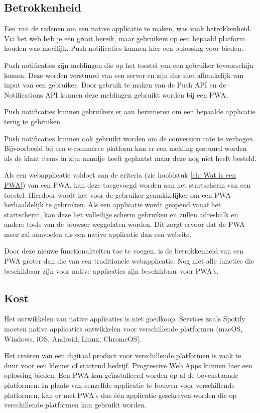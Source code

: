 	
\subsection{Betrokkenheid}
	Een van de redenen om een native applicatie te maken, was vaak betrokkenheid. Via het web heb je een groot bereik, maar gebruikers op een bepaald platform houden was moeilijk. Push notificaties kunnen hier een oplossing voor bieden.
	\autocite{Google2019}

	Push notificaties zijn meldingen die op het toestel van een gebruiker tevoorschijn komen. Deze worden verstuurd van een server en zijn dus niet afhankelijk van input van een gebruiker. Door gebruik te maken van de Push API en de Notifications API kunnen deze meldingen gebruikt worden bij een PWA.
	
	Push notificaties kunnen gebruikers er aan herinneren om een bepaalde applicatie terug te gebruiken. 
	\autocite{Hiltunen2018}
	
	Push notificaties kunnen ook gebruikt worden om de conversion rate te verhogen. Bijvoorbeeld bij een e-commerce platform kan er een melding gestuurd worden als de klant items in zijn mandje heeft geplaatst maar deze nog niet heeft besteld.
	\autocite{Gaunt2020}

	Als een webapplicatie voldoet aan de criteria (zie hoofdstuk \ref{ch: Wat is een PWA}) van een PWA, kan deze toegevoegd worden aan het startscherm van een toestel. Hierdoor wordt het voor de gebruiker gemakkelijker om een PWA herhaaldelijk te gebruiken. Als een applicatie wordt geopend vanaf het startscherm, kan deze het volledige scherm gebruiken en zullen adresbalk en andere tools van de browser weggelaten worden. Dit zorgt ervoor dat de PWA meer zal aanvoelen als een native applicatie dan een website.
	
	Door deze nieuwe functionaliteiten toe te voegen, is de betrokkenheid van een PWA groter dan die van een traditionele webapplicatie. Nog niet alle functies die beschikbaar zijn voor native applicaties zijn beschikbaar voor PWA's.
	

\subsection{Kost}
	Het ontwikkelen van native applicaties is niet goedkoop. Services zoals Spotify moeten native applicaties ontwikkelen voor verschillende platformen (macOS, Windows, iOS, Android, Linux, ChromeOS).
	
	Het creëren van een digitaal product voor verschillende platformen is vaak te duur voor een kleiner of startend bedrijf. Progressive Web Apps kunnen hier een oplossing bieden. Een PWA kan geïnstalleerd worden op al de bovenstaande platformen. In plaats van eenzelfde applicatie te bouwen voor verschillende platformen, kan er met PWA's dus één applicatie geschreven worden die op verschillende platformen kan gebruikt worden.
	
